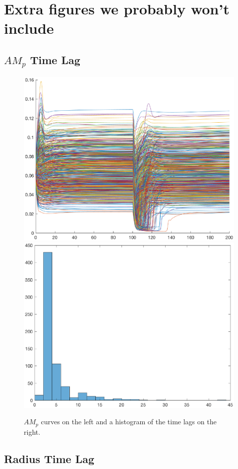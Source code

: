\documentclass[12pt]{article}
\numberwithin{equation}{section}
\begin{document}
\section{Extra figures we probably won't include}
\subsection{$AM_p$ Time Lag}

\begin{figure}[h]
\centering
\includegraphics[width=.49 \textwidth]{Figures/AMp_Curves.eps}
\includegraphics[width=.49 \textwidth]{Figures/AMp_Time_Lag_Histogram.eps}
\caption{$AM_p$ curves on the left and a histogram of the time lags on the right.}
\end{figure}

\subsection{Radius Time Lag}
\end{document}
